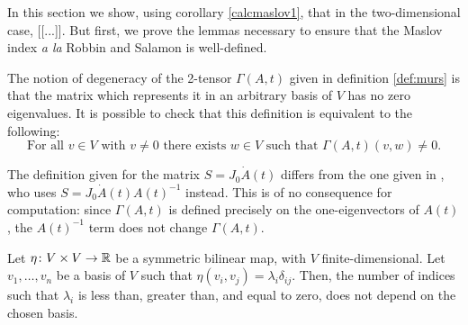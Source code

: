 In this section we show, using corollary \ref{calcmaslov1}, that in the two-dimensional case, [[...]]. But first, we prove the lemmas necessary to ensure that the Maslov index \textit{a la} Robbin and Salamon is well-defined.

\begin{remark}\label{rmk:degendef}
The notion of degeneracy of the 2-tensor $\Gamma(A,t)$ given in definition \ref{def:murs} is that the matrix which represents it in an arbitrary basis of $V$ has no zero eigenvalues. It is possible to check that this definition is equivalent to the following:
\begin{equation}
\text{For all $v \in V$ with $v \neq 0$ there exists $w \in V$ such that $\Gamma(A,t)(v,w) \neq 0$.}
\end{equation}
\end{remark}

\begin{remark}
The definition given for the matrix $S = J_0 \dot A(t)$ differs from the one given in \cite{polterovich}, who uses $S = J_0 \dot A(t) A(t)^{-1}$ instead. This is of no consequence for computation: since $\Gamma(A,t)$ is defined precisely on the one-eigenvectors of $A(t)$, the $A(t)^{-1}$ term does not change $\Gamma(A,t)$.
\end{remark}

\begin{lemma}\label{lemma:signgamma}
Let $\eta \colon V \times V \to \mathbb{R}$ be a symmetric bilinear map, with $V$ finite-dimensional. Let $v_1, \dots, v_n$ be a basis of $V$ such that $\eta(v_i, v_j) = \lambda_i \delta_{ij}$. Then, the number of indices such that $\lambda_i$ is less than, greater than, and equal to zero, does not depend on the chosen basis.
\end{lemma}

